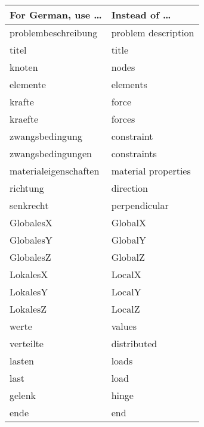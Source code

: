 \begin{appendix}
{\small
\begin{center}
\begin{tabular}{p{3in}p{3in}} \hline
\bf For German, use \dots	& \bf Instead of \dots \\
\hline 
problembeschreibung 	& problem description \\
titel 			& title \\
knoten 			& nodes \\
elemente 		& elements \\
krafte 			& force \\
kraefte			& forces \\
zwangsbedingung		& constraint \\
zwangsbedingungen 	& constraints \\
materialeigenschaften 	& material properties \\
richtung 		& direction \\
senkrecht 		& perpendicular \\
GlobalesX 		& GlobalX \\
GlobalesY 		& GlobalY \\
GlobalesZ 		& GlobalZ \\
LokalesX 		& LocalX \\
LokalesY 		& LocalY \\
LokalesZ 		& LocalZ \\
werte 			& values \\
verteilte 		& distributed  \\
lasten 			& loads \\
last 			& load \\
gelenk 			& hinge \\
ende 			& end \\
\end{tabular}
\end{center}}


\end{appendix}

